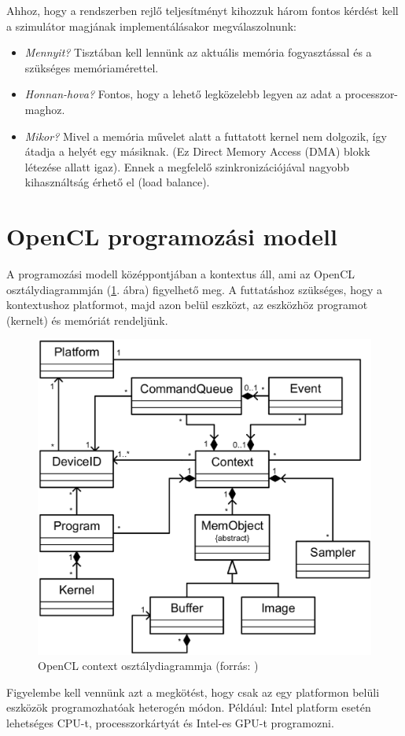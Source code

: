 	Ahhoz, hogy a rendszerben rejlő teljesítményt kihozzuk három fontos kérdést
	kell a szimulátor magjának implementálásakor megválaszolnunk:
	\begin{itemize}
		\item \emph{Mennyit?} Tisztában kell lennünk az aktuális
		memória fogyasztással és a szükséges memóriamérettel.
		\item \emph{Honnan-hova?} Fontos, hogy a lehető legközelebb legyen az adat
		a processzor-maghoz.
		\item \emph{Mikor?} Mivel a memória művelet alatt a futtatott kernel nem
		dolgozik, így átadja a helyét egy másiknak. (Ez Direct Memory Access (DMA)
		blokk létezése allatt igaz). Ennek a megfelelő szinkronizációjával nagyobb
		kihasználtság érhető el (load balance).
	\end{itemize}
	
	
\section{OpenCL programozási modell}
	
	A programozási modell középpontjában a kontextus áll, ami az OpenCL
	osztálydiagrammján (\ref{fig:class}. ábra) figyelhető meg.
	A futtatáshoz szükséges, hogy a kontextushoz platformot, majd azon belül
	eszközt, az eszközhöz programot (kernelt) és memóriát rendeljünk.
	\begin{figure}[!ht]
		\centering
		\includegraphics[width=0.6\columnwidth]{figures/eps/context.eps}
		\caption[OpenCL context osztálydiagrammja]{OpenCL context osztálydiagrammja (forrás: \cite{opencl})} 
		\label{fig:class} 
	\end{figure}
	Figyelembe kell vennünk azt a megkötést, hogy csak az egy platformon belüli
	eszközök programozhatóak heterogén módon. Például: Intel platform esetén
	lehetséges CPU-t, processzorkártyát és Intel-es GPU-t programozni.
	
